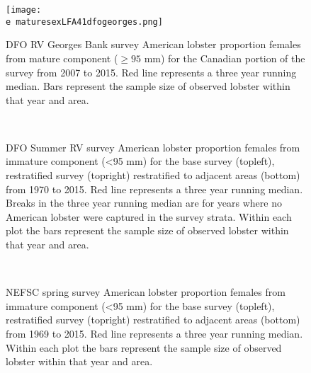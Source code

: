 \documentclass[11pt]{article}
\newcommand{\e}{/backup/bio_data/bio.lobster/figures/} %
\begin{document}
\begin{figure}

    \texttt{[image: \\e maturesexLFA41dfogeorges.png]}
    \caption{DFO RV Georges Bank survey American lobster proportion females from mature component ($ \ge 95$ mm) for the Canadian portion of the survey from 2007 to 2015. Red line represents a three year running median. Bars represent the sample size of observed lobster within that year and area.}

\end{figure}


\begin{figure}
\centering
{}
\\
\caption{DFO Summer RV survey American lobster proportion females from immature component (\textless 95 mm) for the base survey (topleft), restratified survey (topright) restratified to adjacent areas (bottom) from 1970 to 2015. Red line represents a three year running median. Breaks in the three year running median are for years where no American lobster were captured in the survey strata. Within each plot the bars represent the sample size of observed lobster within that year and area.}
\end{figure}
\clearpage


\begin{figure}
\centering
{}
\\
\caption{NEFSC spring survey American lobster proportion females from immature component (\textless 95 mm) for the base survey (topleft), restratified survey (topright) restratified to adjacent areas (bottom) from 1969 to 2015. Red line represents a three year running median. Within each plot the bars represent the sample size of observed lobster within that year and area. }
\end{figure}
\clearpage
\end{document}
